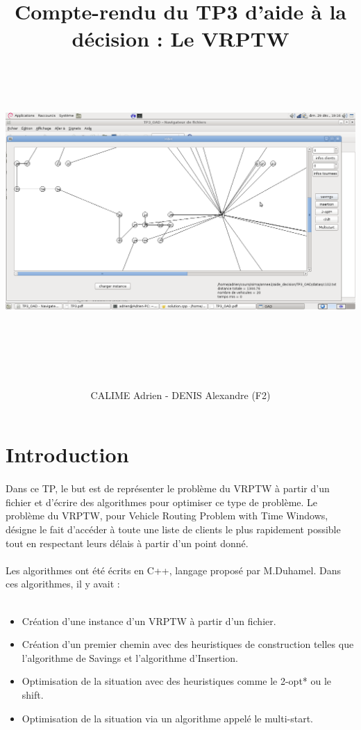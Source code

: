\documentclass[12pt]{article}
\title{\Huge{Compte-rendu du TP3 d'aide à la décision : Le VRPTW}\vspace{2\baselineskip} \\\ \includegraphics[width=15cm,height=10cm]{Capture.png}   \\\ }
\author{CALIME Adrien - DENIS Alexandre (F2)}
\date{}
\begin{document}
\maketitle

\clearpage
\tableofcontents

\clearpage
\section{Introduction}\vspace{2\baselineskip}

\paragraph{}
Dans ce TP, le but est de représenter le problème du VRPTW à partir d'un fichier et d'écrire des algorithmes pour optimiser ce type de problème. 
Le problème du VRPTW, pour Vehicle Routing Problem with Time Windows, désigne le fait d'accéder à toute une liste de clients le plus rapidement 
possible tout en respectant leurs délais à partir d'un point donné.
\\

\paragraph{}
Les algorithmes ont été écrits en C++, langage proposé par M.Duhamel. Dans ces algorithmes, il y avait : \\\
\begin{itemize}
  \item Création d'une instance d'un VRPTW à partir d'un fichier.
  \item Création d'un premier chemin avec des heuristiques de construction telles que l'algorithme de Savings et l'algorithme d'Insertion.
  \item Optimisation de la situation avec des heuristiques comme le 2-opt* ou le shift.
  \item Optimisation de la situation via un algorithme appelé le multi-start.\\
\end{itemize}
\end{document}
